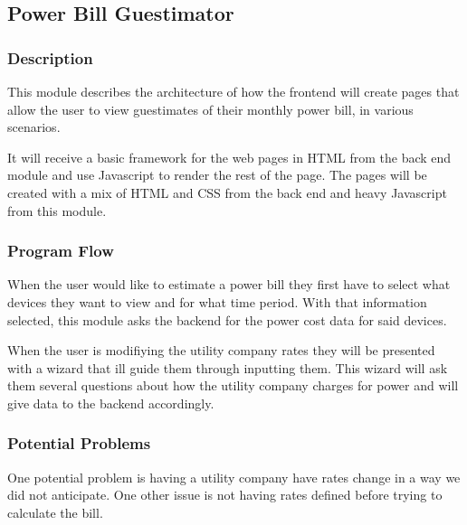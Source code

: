 
\subsection{Power Bill Guestimator}

\subsubsection{Description}

This module describes the architecture of how the frontend will create pages that allow the user to view guestimates of their monthly power bill, in various scenarios.

It will receive a basic framework for the web pages in HTML from the back end module and use Javascript to render the rest of the page. 
The pages will be created with a mix of HTML and CSS from the back end and heavy Javascript from this module. 

\subsubsection{Program Flow}

When the user would like to estimate a power bill they first have to select what devices they want to view and for what time period.
With that information selected, this module asks the backend for the power cost data for said devices.

When the user is modifiying the utility company rates they will be presented with a wizard that ill guide them through inputting them.
This wizard will ask them several questions about how the utility company charges for power and will give data to the backend accordingly.


\subsubsection{Potential Problems}

One potential problem is having a utility company have rates change in a way we did not anticipate.
One other issue is not having rates defined before trying to calculate the bill.

